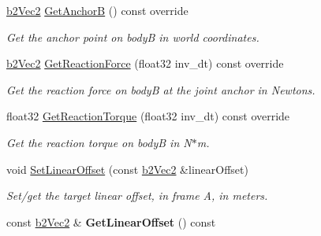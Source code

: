 \begin{DoxyCompactItemize}
\mbox{\label{classb2MotorJoint_a5d563fd070f7b6cfe8db6f83e1bebbcd}} 
\hyperlink{structb2Vec2}{b2\+Vec2} \hyperlink{classb2MotorJoint_a5d563fd070f7b6cfe8db6f83e1bebbcd}{Get\+AnchorB} () const override
\begin{DoxyCompactList}\small\item\em Get the anchor point on bodyB in world coordinates. \end{DoxyCompactList}\item 
\mbox{\label{classb2MotorJoint_a85a3ac568e797d0620dcf4f7532ed949}} 
\hyperlink{structb2Vec2}{b2\+Vec2} \hyperlink{classb2MotorJoint_a85a3ac568e797d0620dcf4f7532ed949}{Get\+Reaction\+Force} (float32 inv\+\_\+dt) const override
\begin{DoxyCompactList}\small\item\em Get the reaction force on bodyB at the joint anchor in Newtons. \end{DoxyCompactList}\item 
\mbox{\label{classb2MotorJoint_a542b68309e0294f8bda152eff92086d9}} 
float32 \hyperlink{classb2MotorJoint_a542b68309e0294f8bda152eff92086d9}{Get\+Reaction\+Torque} (float32 inv\+\_\+dt) const override
\begin{DoxyCompactList}\small\item\em Get the reaction torque on bodyB in N$\ast$m. \end{DoxyCompactList}\item 
\mbox{\label{classb2MotorJoint_a99254b5fc9ed9f2d0fdccada513000c3}} 
void \hyperlink{classb2MotorJoint_a99254b5fc9ed9f2d0fdccada513000c3}{Set\+Linear\+Offset} (const \hyperlink{structb2Vec2}{b2\+Vec2} \&linear\+Offset)
\begin{DoxyCompactList}\small\item\em Set/get the target linear offset, in frame A, in meters. \end{DoxyCompactList}\item 
\mbox{\label{classb2MotorJoint_a21a2e1b6484194dc2c5cf3037404bc6d}} 
const \hyperlink{structb2Vec2}{b2\+Vec2} \& {\bfseries Get\+Linear\+Offset} () const
\item 
\mbox{\label{classb2MotorJoint_a14d7dca1767548ddffe293e39cafc3c7}} 

\end{DoxyCompactItemize}
